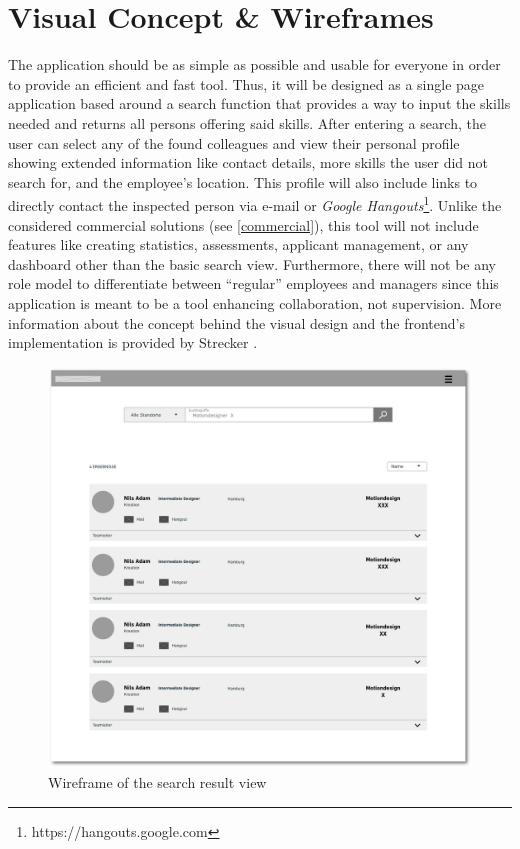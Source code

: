 \section{Visual Concept \& Wireframes}
The application should be as simple as possible and usable for everyone in order to provide an efficient and fast tool. Thus, it will be designed as a single page application based around a search function that provides a way to input the skills needed and returns all persons offering said skills. After entering a search, the user can select any of the found colleagues and view their personal profile showing extended information like contact details, more skills the user did not search for, and the employee's location. This profile will also include links to directly contact the inspected person via e-mail or \textit{Google Hangouts}\footnote{https://hangouts.google.com}. Unlike the considered commercial solutions (see \ref{commercial}), this tool will not include features like creating statistics, assessments, applicant management, or any dashboard other than the basic search view.
Furthermore, there will not be any role model to differentiate between ``regular'' employees and managers since this application is meant to be a tool enhancing collaboration, not supervision. More information about the concept behind the visual design and the frontend's implementation is provided by Strecker \cite{strecker}.
\newpage
\begin{figure}[hp]
    \centering
    \includegraphics[width=\textwidth]{images/wireframe.png}
    \caption[Illustration: Search Result Page (Wireframe)]{Wireframe of the search result view}
    \label{fig:wireframe}
\end{figure}
